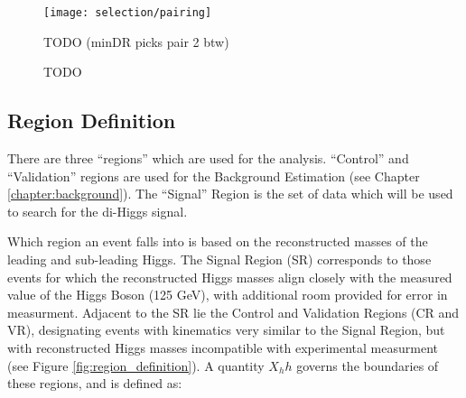         \begin{figure}[tbh]
            \texttt{[image: selection/pairing]}
            \caption{
                TODO (minDR picks pair 2 btw)\cite{hh4b_2021_int_note}
            }
            \label{fig:minDR_pairing_diagram}
        \end{figure}

        \begin{figure}[hbt]
            \centering
            \caption{TODO \cite{hh4b_2021_int_note}}
            \label{fig:HHpairing}
        \end{figure}
                                                                                                         
        \FloatBarrier


    \subsection{Region Definition}
        
        There are three ``regions'' which are used for the analysis.
        ``Control'' and ``Validation'' regions are used for the Background Estimation (see Chapter \ref{chapter:background}).
        The ``Signal'' Region is the set of data which will be used to search for the di-Higgs signal.

        Which region an event falls into is based on the reconstructed masses of the leading and sub-leading Higgs.
        The Signal Region (SR) corresponds to those events for which the reconstructed Higgs masses
            align closely with the measured value of the Higgs Boson (125 GeV), with additional room provided for error in measurment.
        Adjacent to the SR lie the Control and Validation Regions (CR and VR),
            designating events with kinematics very similar to the Signal Region,
            but with reconstructed Higgs masses incompatible with experimental measurment (see Figure \ref{fig:region_definition}).
        A quantity $X_hh$ governs the boundaries of these regions, and is defined as:

